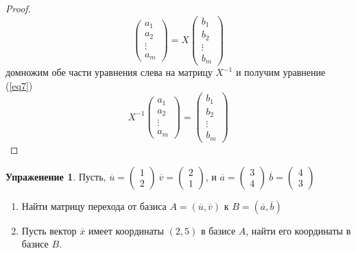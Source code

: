 \documentclass[]{article}
\theoremstyle{theorem}
\theoremstyle{definition}
\newtheorem{tk}{Упраженение}
\begin{document}
\begin{proof}
\begin{equation*}
	\begin{pmatrix}
		a_1
		\\
		a_2
		\\
		\vdots
		\\
		a_m
	\end{pmatrix}
	=X
	\begin{pmatrix}
		b_1
		\\
		b_2
		\\
		\vdots
		\\
		b_m
	\end{pmatrix}
\end{equation*}
домножим обе части уравнения слева на матрицу $X^{-1}$ и получим уравнение (\ref{eq7})
\begin{equation*}
X^{-1}
\begin{pmatrix}
	a_1
	\\
	a_2
	\\
	\vdots
	\\
	a_m
\end{pmatrix}
=
\begin{pmatrix}
	b_1
	\\
	b_2
	\\
	\vdots
	\\
	b_m
\end{pmatrix}
\end{equation*}
\end{proof}

\begin{tk}
	Пусть, $\overline{u}=
	\begin{pmatrix}
	1\\
	2
	\end{pmatrix}\
	\overline{v}=
	\begin{pmatrix}
		2\\
		1
	\end{pmatrix}$,
	и
	$\overline{a}=
	\begin{pmatrix}
		3\\
		4
	\end{pmatrix}\
	\overline{b}=
	\begin{pmatrix}
		4\\
		3
	\end{pmatrix}$
	\begin{enumerate}
		\item
		Найти матрицу перехода от базиса $A=(\overline{u}, \overline{v})$ к $B=(\overline{a}, \overline{b})$ 
		\item
		Пусть вектор $\overline{x}$ имеет координаты $(2,5)$ в базисе $A$, найти его координаты в базисе $B$.
	\end{enumerate}
\end{tk}
\end{document}

